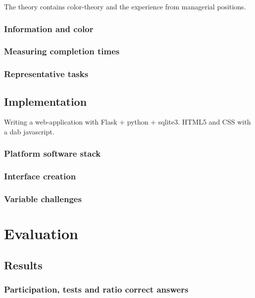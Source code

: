 \documentclass[nofilelist]{cslthse-msc}
\begin{document}
			The theory contains color-theory and the experience from managerial
			positions.

			\subsection{Information and color}

			\subsection{Measuring completion times}

			\subsection{Representative tasks}

		\section{Implementation}

			Writing a web-application with Flask + python + sqlite3.
			HTML5 and CSS with a dab javascript.

			\subsection{Platform software stack}

			\subsection{Interface creation}

			\subsection{Variable challenges}

	\chapter{Evaluation}

		\section{Results}

			\subsection{Participation, tests and ratio correct answers}
\end{document}
